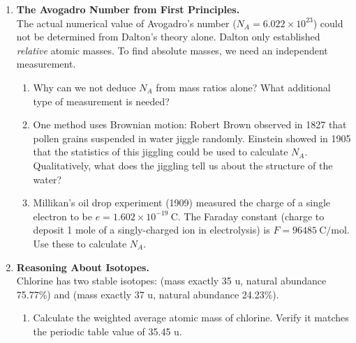 \documentclass[12pt, a4paper]{book}
\theoremstyle{definition}
\begin{document}
\begin{deepbox}
\begin{enumerate}[label=\textbf{D\arabic*.}]

  \item \textbf{The Avogadro Number from First Principles.}\\
        The actual numerical value of Avogadro's number
        ($N_A = 6.022\times10^{23}$) could not be determined
        from Dalton's theory alone.
        Dalton only established \emph{relative} atomic masses.
        To find absolute masses, we need an independent measurement.

        \begin{enumerate}[label=(\alph*)]
          \item Why can we not deduce $N_A$ from mass ratios alone?
                What additional type of measurement is needed?

          \item One method uses Brownian motion:
                Robert Brown observed in 1827 that pollen grains
                suspended in water jiggle randomly.
                Einstein showed in 1905 that the statistics of
                this jiggling could be used to calculate $N_A$.
                Qualitatively, what does the jiggling tell us
                about the structure of the water?

          \item Millikan's oil drop experiment (1909) measured
                the charge of a single electron to be
                $e = 1.602\times10^{-19}\ \si{\coulomb}$.
                The Faraday constant (charge to deposit 1 mole
                of a singly-charged ion in electrolysis) is
                $F = \SI{96485}{\coulomb\per\mol}$.
                Use these to calculate $N_A$.
        \end{enumerate}

  \item \textbf{Reasoning About Isotopes.}\\
        Chlorine has two stable isotopes:
         (mass exactly 35 u, natural abundance 75.77\%)
        and  (mass exactly 37 u, natural abundance 24.23\%).

        \begin{enumerate}[label=(\alph*)]
          \item Calculate the weighted average atomic mass of chlorine.
                Verify it matches the periodic table value of 35.45 u.


\end{enumerate}
\end{enumerate}
\end{deepbox}
\end{document}
